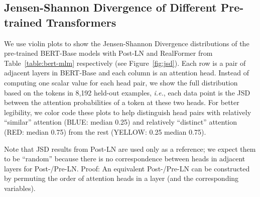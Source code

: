 \documentclass[11pt,a4paper]{article}
\begin{document}
\subsection{Jensen-Shannon Divergence of Different Pre-trained Transformers} \label{sec:appendix:jsd}

We use violin plots to show the Jensen-Shannon Divergence distributions of the pre-trained BERT-Base models with Post-LN and RealFormer from Table~\ref{table:bert-mlm} respectively (see Figure~\ref{fig:jsd}). 
Each row is a pair of adjacent layers in BERT-Base and each column is an attention head. 
Instead of computing one scalar value for each head pair, we show the full distribution based on the tokens in 8,192 held-out examples, \emph{i.e.}, each data point is the JSD between the attention probabilities of a token at these two heads.
For better legibility, we color code these plots to help distinguish head pairs with relatively ``similar'' attention (BLUE: median  0.25) and relatively ``distinct'' attention (RED: median  0.75) from the rest (YELLOW: 0.25  median  0.75).

Note that JSD results from Post-LN are used only as a reference; we expect them to be ``random'' because there is no correspondence between heads in adjacent layers for Post-/Pre-LN. Proof: An equivalent Post-/Pre-LN can be constructed by permuting the order of attention heads in a layer (and the corresponding variables).



\begin{figure*}[!h]
\centering
{}
\caption{Distribution of Jensen-Shannon Divergence (JSD) of attention probabilities in (vertically) adjacent attention heads, \emph{i.e.}, . Based on 8,192 held-out examples using the pre-trained BERT-Base with \textbf{RealFormer} and \textbf{Post-LN} Transformer respectively (see Section~\ref{sec:pre-train}). Distributions are color-coded based on the median of JSDs: RED (median  0.75), YELLOW (0.25  median  0.75), BLUE (median  0.25). \emph{I.e.}, colder color means more ``similar'' attention heads across adjacent layers.}
\label{fig:jsd}
\end{figure*}
\end{document}
